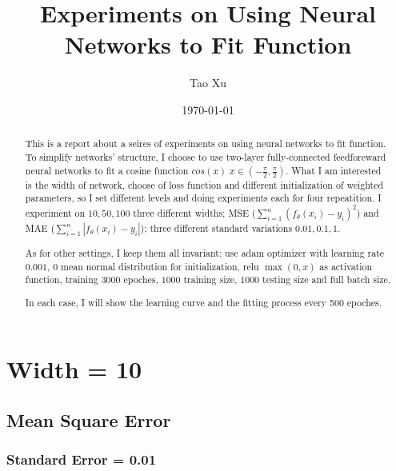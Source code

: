 \documentclass[12pt]{article}
\title{Experiments on Using Neural Networks to Fit Function}
\author{Tao Xu}
\date{\today}
\theoremstyle{remark}
\begin{document}
	\maketitle
	\tableofcontents
	
	\begin{abstract}
		This is a report about a seires of experiments on using neural networks to fit function. 
		To simplify networks' structure, I choose to use two-layer fully-connected feedforeward neural networks to fit a 
		cosine function $cos(x)\; x\in(-\frac{\pi}{2},\frac{\pi}{2})$. 
		What I am interested is the width of network, choose of loss function and different initialization of weighted
		parameters, so I set different levels and doing experiments each for four repeatition. I experiment on $10,50,100$
		three different widths; MSE ($\sum\limits_{i=1}^{n}(f_\theta(x_i)-y_i)^2$) and MAE ($\sum\limits_{i=1}^{n}\left|f_\theta(x_i)-y_i\right|$);
		three different standard variations $0.01,0.1,1$.
		
		As for other settings, I keep them all invariant: use adam optimizer with learning rate $0.001$, 0 mean normal 
		distribution for initialization, relu $\operatorname{max}(0,x)$ as activation function, training $3000$ epoches,
		$1000$ training size, $1000$ testing size and full batch size.

		In each case, I will show the learning curve and the fitting process every 500 epoches.
	\end{abstract}

	\newpage

	

	\section{Width = 10}
		\subsection{Mean Square Error}
			\subsubsection{Standard Error = 0.01}
		
\end{document}
